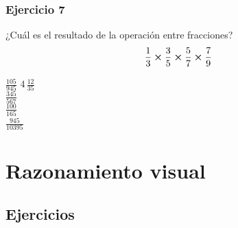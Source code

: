 \begin{frame}
\frametitle{Ejercicio 7}
¿Cuál es el resultado de la operación entre fracciones?
\begin{align*}
\dfrac{1}{3} \cp \dfrac{3}{5} \cp \dfrac{5}{7} \cp \dfrac{7}{9}
\end{align*}
\begin{choices}
\choice $\frac{105}{945}$
\choice $4 \, \frac{12}{35}$ \\
\choice $\frac{345}{567}$ \\
\choice $\frac{100}{165}$ \\
\choice $\frac{945}{10395}$ \
\end{choices}
\pause
{}
\end{frame}

\section{Razonamiento visual}
\subsection{Ejercicios}

